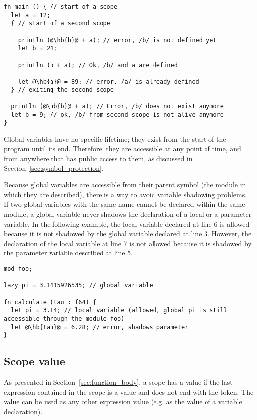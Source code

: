 \begin{lstlisting}[style=coloredverbatim, escapechar=@]
fn main () { // start of a scope
  let a = 12;
  { // start of a second scope

    println (@\hb{b}@ + a); // error, /b/ is not defined yet
    let b = 24;

    println (b + a); // Ok, /b/ and a are defined

    let @\hb{a}@ = 89; // error, /a/ is already defined
  } // exiting the second scope

  println (@\hb{b}@ + a); // Error, /b/ does not exist anymore
  let b = 9; // ok, /b/ from second scope is not alive anymore
}
\end{lstlisting}

Global variables have no specific lifetime; they exist from the start of the
program until its end. Therefore, they are accessible at any point of time, and
from anywhere that has public access to them, as discussed in
Section~\ref{sec:symbol_protection}.

Because global variables are accessible from their parent symbol (the module in
which they are described), there is a way to avoid variable shadowing problems.
If two global variables with the same name cannot be declared within the same
module, a global variable never shadows the declaration of a local or a
parameter variable. In the following example, the local variable 
declared at line 6 is allowed because it is not shadowed by the global variable
declared at line 3. However, the declaration of the local variable 
at line 7 is not allowed because it is shadowed by the parameter variable
described at line 5.

\begin{lstlisting}[style=coloredverbatim, escapechar=@]
mod foo;

lazy pi = 3.1415926535; // global variable

fn calculate (tau : f64) {
  let pi = 3.14; // local variable (allowed, global pi is still accessible through the module foo)
  let @\hb{tau}@ = 6.28; // error, shadows parameter
}

\end{lstlisting}

\subsection{Scope value}

As presented in Section~\ref{sec:function_body}, a scope has a value if the last
expression contained in the scope is a value and does not end with the \token{;}
token. The value can be used as any other expression value (e.g. as the value of
a variable declaration).


